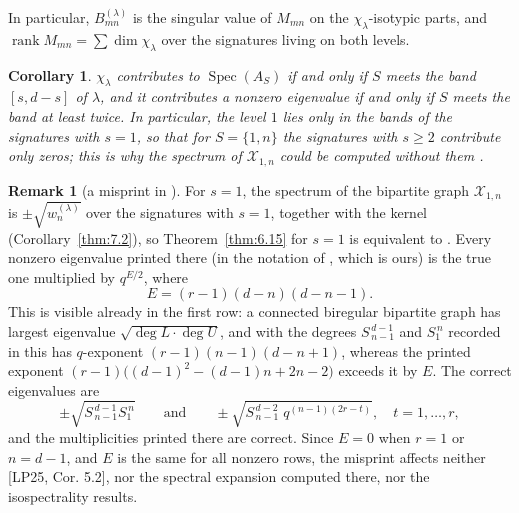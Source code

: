 \documentclass[11pt]{article}
\numberwithin{equation}{section}
\theoremstyle{plain}
\newtheorem{corollary}[theorem]{Corollary}
\theoremstyle{definition}
\newtheorem{remark}[theorem]{Remark}
\begin{document}
In particular, $B^{(\lambda)}_{mn}$ is the singular value of $M_{mn}$ on the
$\chi_\lambda$-isotypic parts, and $\operatorname{rank}M_{mn}=\sum\dim\chi_\lambda$ over
the signatures living on both levels.

\begin{corollary}\label{thm:7.3}
$\chi_\lambda$ contributes to $\operatorname{Spec}(A_S)$ if and only
if $S$ meets the band $[s,d-s]$ of $\lambda$, and it contributes a nonzero eigenvalue
if and only if $S$ meets the band at least twice. In particular, the level $1$ lies
only in the bands of the signatures with $s=1$, so that for $S=\{1,n\}$ the
signatures with $s\ge2$ contribute only zeros; this is why the spectrum of
$\mathcal{X}_{1,n}$ could be computed without them \cite{LP25}.
\end{corollary}

\begin{remark}[{a misprint in \cite[Thm. 5.1]{LP25}}]\label{thm:7.4}
For $s=1$, the spectrum of the
bipartite graph $\mathcal{X}_{1,n}$ is $\pm\sqrt{w^{(\lambda)}_n}$ over the signatures
with $s=1$, together with the kernel (Corollary~\ref{thm:7.2}), so Theorem~\ref{thm:6.15} for $s=1$ is
equivalent to \cite[Thm. 5.1]{LP25}. Every nonzero eigenvalue printed there (in the notation
of \cite{LP25}, which is ours) is the true one multiplied by $q^{E/2}$, where
\[
E=(r-1)(d-n)(d-n-1).
\]
This is visible already in the first row: a connected biregular bipartite graph has
largest eigenvalue $\sqrt{\deg L\cdot\deg U}$, and with the degrees
$S^{\,d-1}_{\,n-1}$ and $S^{\,n}_1$ recorded in \cite{LP25} this has $q$-exponent
$(r-1)(n-1)(d-n+1)$, whereas the printed exponent
$(r-1)\bigl((d-1)^2-(d-1)n+2n-2\bigr)$ exceeds it by $E$. The correct eigenvalues are
\[
\pm\sqrt{S^{\,d-1}_{\,n-1}S^{\,n}_{1}}
\qquad\text{and}\qquad
\pm\sqrt{S^{\,d-2}_{\,n-1}\;q^{(n-1)(2r-t)}},\quad t=1,\dots,r,
\]
and the multiplicities printed there are correct. Since $E=0$ when $r=1$ or $n=d-1$,
and $E$ is the same for all nonzero rows, the misprint affects neither [LP25,
Cor. 5.2], nor the spectral expansion computed there, nor the isospectrality results.
\end{remark}
\end{document}
